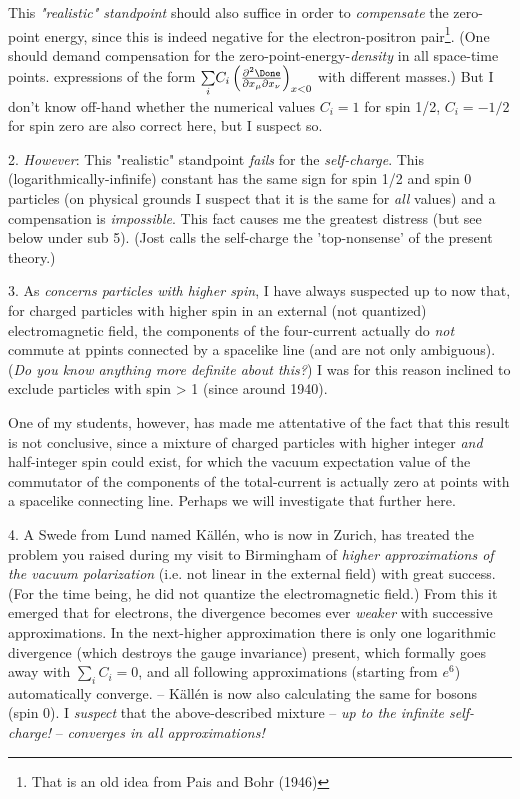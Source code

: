 \documentclass{article}
\newcommand{\sumX}[1]{\underset{#1}{\sum}}
\begin{document}
This \textit{"realistic" standpoint} should also suffice in order to \textit{compensate} the zero-point energy, since this is indeed negative for the electron-positron pair\footnote{That is an old idea from Pais and Bohr (1946)}. (One should demand compensation for the zero-point-energy-\textit{density} in all space-time points.  expressions of the form $\sumX{i}{C_i \left(\frac{\partial^2\Done}{\partial x_\mu \partial x_\nu}\right)_{x<0}}$ with different masses.) But I don't know off-hand whether the numerical values $C_i=1$ for spin 1/2, $C_i=-1/2$ for spin zero are also correct here, but I suspect so.

2. \textit{However}: This "realistic" standpoint \textit{fails} for the \textit{self-charge}. This (logarithmically-infinife) constant has the same sign for spin 1/2 and spin 0 particles (on physical grounds I suspect that it is the same for \textit{all} values) and a compensation is \textit{impossible}. This fact causes me the greatest distress (but see below under sub 5). (Jost calls the self-charge the 'top-nonsense' of the present theory.)

3. As \textit{concerns particles with higher spin}, I have always suspected up to now that, for charged particles with higher spin in an external (not quantized) electromagnetic field, the components of the four-current actually do \textit{not} commute at ppints connected by a spacelike line (and are not only ambiguous). (\textit{Do you know anything more definite about this?}) I was for this reason inclined to exclude particles with spin > 1 (since around 1940).

One of my students, however, has made me attentative of the fact that this result is not conclusive, since a mixture of charged particles with higher integer \textit{and} half-integer spin could exist, for which the vacuum expectation value of the commutator of the components of the total-current is actually zero at points with a spacelike connecting line. Perhaps we will investigate that further here.

4. A Swede from Lund named K\"all\'en, who is now in Zurich, has treated the problem you raised during my visit to Birmingham of \textit{higher approximations of the vacuum polarization} (i.e. not linear in the external field) with great success. (For the time being, he did not quantize the electromagnetic field.) From this it emerged that for electrons, the divergence becomes ever \textit{weaker} with successive approximations. In the next-higher approximation there is only one logarithmic divergence (which destroys the gauge invariance) present, which formally goes away with $\sumX{i}{C_i} = 0$, and all following approximations (starting from $e^6$) automatically converge. -- K\"all\'en is now also calculating the same for bosons (spin 0). I \textit{suspect} that the above-described mixture -- \textit{up to the infinite self-charge!} -- \textit{converges in all approximations!}
\end{document}
